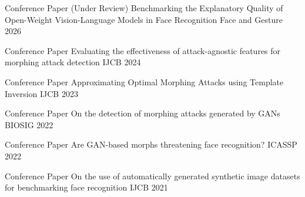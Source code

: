 

\begin{cvhonors}

  \cvhonor
    {Conference Paper (Under Review)} %
    {Benchmarking the Explanatory Quality of Open-Weight Vision-Language Models in Face Recognition} %
    {Face and Gesture} %
    {2026} %

  \cvhonor
    {Conference Paper} %
    {Evaluating the effectiveness of attack-agnostic features for morphing attack detection} %
    {IJCB} %
    {2024} %

  \cvhonor
    {Conference Paper} %
    {Approximating Optimal Morphing Attacks using Template Inversion} %
    {IJCB} %
    {2023} %

  \cvhonor
    {Conference Paper} %
    {On the detection of morphing attacks generated by GANs} %
    {BIOSIG} %
    {2022} %

  \cvhonor
    {Conference Paper} %
    {Are GAN-based morphs threatening face recognition?} %
    {ICASSP} %
    {2022} %

  \cvhonor
    {Conference Paper} %
    {On the use of automatically generated synthetic image datasets for benchmarking face recognition} %
    {IJCB} %
    {2021} %

\end{cvhonors}

